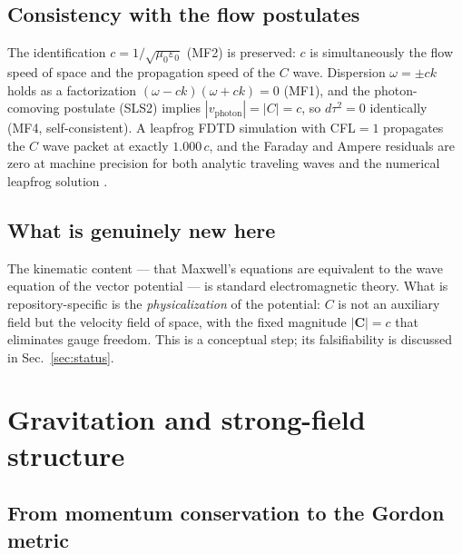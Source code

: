 \documentclass[aps,prd,preprint,superscriptaddress,amsmath,amssymb]{revtex4-2}
\begin{document}
\subsection{Consistency with the flow postulates}

The identification $c=1/\sqrt{\mu_0\varepsilon_0}$ (MF2) is preserved: $c$
is simultaneously the flow speed of space and the propagation speed of the
$C$ wave.  Dispersion $\omega=\pm ck$ holds as a factorization
$(\omega-ck)(\omega+ck)=0$ (MF1), and the photon-comoving postulate (SLS2)
implies $|v_{\mathrm{photon}}|=|C|=c$, so $d\tau^2=0$ identically (MF4,
self-consistent).  A leapfrog FDTD simulation with CFL$=1$ propagates the
$C$ wave packet at exactly $1.000\,c$, and the Faraday and Ampere residuals
are zero at machine precision for both analytic traveling waves and the
numerical leapfrog solution \cite{ProjectionPhysics-MS}.

\subsection{What is genuinely new here}

The kinematic content --- that Maxwell's equations are equivalent to the
wave equation of the vector potential --- is standard electromagnetic theory.
What is repository-specific is the \emph{physicalization} of the potential:
$C$ is not an auxiliary field but the velocity field of space, with the
fixed magnitude $|\bm{C}|=c$ that eliminates gauge freedom.  This is a
conceptual step; its falsifiability is discussed in Sec.~\ref{sec:status}.

\section{Gravitation and strong-field structure}\label{sec:gravity}

\subsection{From momentum conservation to the Gordon metric}
\end{document}
